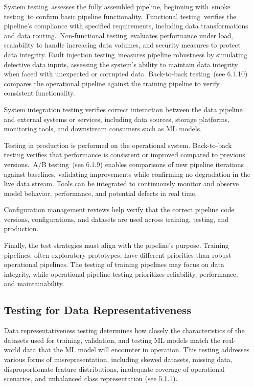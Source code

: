 \documentclass[
  letterpaper,
  DIV=11,
  numbers=noendperiod,
  oneside]{scrreprt}
\begin{document}
\begin{tcolorbox}
System testing~assesses the fully assembled pipeline, beginning
with~smoke testing~to confirm basic pipeline functionality.~Functional
testing~verifies the pipeline's compliance with specified requirements,
including data transformations and data routing.~Non-functional
testing~evaluates performance under load, scalability to handle
increasing data volumes, and security measures to protect data
integrity. Fault injection testing~measures pipeline robustness by
simulating defective data inputs, assessing the system's ability to
maintain data integrity when faced with unexpected or corrupted data.
Back-to-back testing~(see 6.1.10) compares the operational pipeline
against the training pipeline to verify consistent functionality.

System integration testing verifies correct interaction between the data
pipeline and external systems or services, including data sources,
storage platforms, monitoring tools, and downstream consumers such as ML
models.

Testing in production is performed on the operational system.
Back-to-back testing verifies that performance is consistent or improved
compared to previous versions.~A/B testing~(see 6.1.9) enables
comparisons of new pipeline iterations against baselines, validating
improvements while confirming no degradation in the live data stream.
Tools can be integrated to continuously monitor and observe model
behavior, performance, and potential defects in real time.

Configuration management reviews help verify that the correct pipeline
code versions, configurations, and datasets are used across training,
testing, and production.~

Finally, the test strategies must align with the pipeline's purpose.
Training pipelines, often exploratory prototypes, have different
priorities than robust operational pipelines. The testing of training
pipelines may focus on data integrity, while operational pipeline
testing prioritizes reliability, performance, and maintainability.

\subsection{Testing for Data
Representativeness}\label{testing-for-data-representativeness}

Data representativeness testing{} determines how closely the
characteristics of the datasets used for training, validation, and
testing ML models match the real-world data that the ML model will
encounter in operation. This testing addresses various forms of
misrepresentation, including skewed datasets, missing data,
disproportionate feature distributions, inadequate coverage of
operational scenarios, and imbalanced class representation (see 5.1.1).


\end{tcolorbox}
\end{document}
